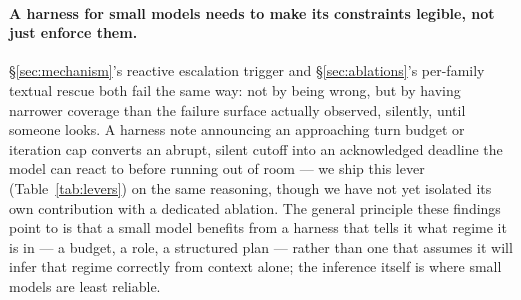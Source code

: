 \documentclass[smallcondensed,natbib]{svjour3}
\begin{document}
\paragraph{A harness for small models needs to make its constraints
legible, not just enforce them.} \S\ref{sec:mechanism}'s reactive
escalation trigger and \S\ref{sec:ablations}'s per-family textual
rescue both fail the same way: not by being wrong, but by having
narrower coverage than the failure surface actually observed, silently,
until someone looks. A harness note announcing an approaching turn
budget or iteration cap converts an abrupt, silent cutoff into an
acknowledged deadline the model can react to before running out of
room --- we ship this lever (Table~\ref{tab:levers}) on the same
reasoning, though we have not yet isolated its own contribution with a
dedicated ablation. The general principle these findings point to is
that a small model benefits from a harness that tells it what regime it
is in --- a budget, a role, a structured plan --- rather than one that
assumes it will infer that regime correctly from context alone; the
inference itself is where small models are least reliable.
\end{document}
